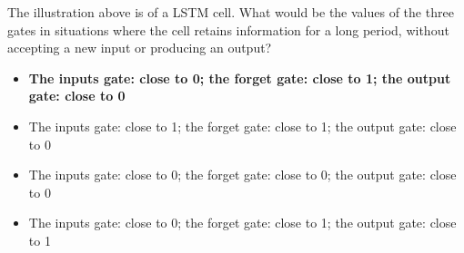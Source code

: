 The illustration above is of a LSTM cell. What would be the values of the three gates in situations where the cell retains information for a long period, without accepting a new input or producing an output?

\begin{itemize}
    \item \textbf{The inputs gate: close to 0; the forget gate: close to 1; the output gate: close to 0}
    \item The inputs gate: close to 1; the forget gate: close to 1; the output gate: close to 0
    \item The inputs gate: close to 0; the forget gate: close to 0; the output gate: close to 0
    \item The inputs gate: close to 0; the forget gate: close to 1; the output gate: close to 1
\end{itemize}



